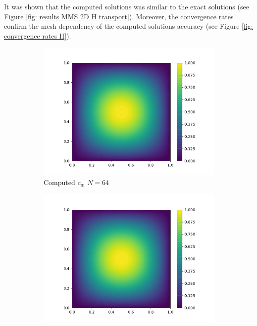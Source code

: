 It was shown that the computed solutions was similar to the exact solutions (see Figure \ref{fig: results MMS 2D H transport}).
Moreover, the convergence rates confirm the mesh dependency of the computed solutions accuracy (see Figure \ref{fig: convergence rates H}).

\begin{figure}
    \centering
    \begin{subfigure}{0.3\linewidth}
        \centering
        \includegraphics[width=\linewidth]{Figures/Chapter2/c_m.pdf}
        \caption{Computed $c_\mathrm{m}$ $N=64$}
    \end{subfigure}%
    \begin{subfigure}{0.3\linewidth}
        \centering
        \includegraphics[width=\linewidth]{Figures/Chapter2/c_t.pdf}

\end{subfigure}
\end{figure}
